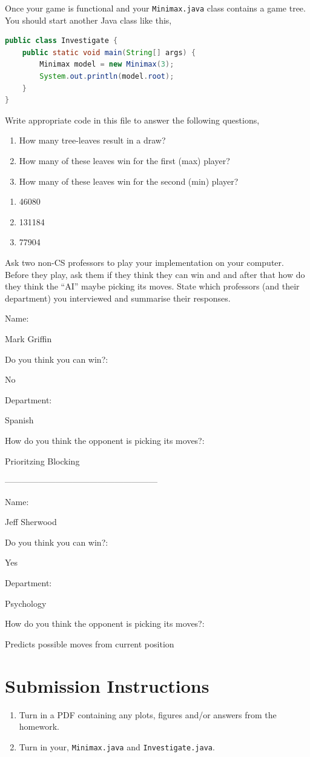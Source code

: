 \documentclass{homework}
\begin{document}
\question Once your game is functional and your \texttt{Minimax.java} class
contains a game tree.  You should start another Java class like this,
\begin{lstlisting}[language=Java]
public class Investigate {
    public static void main(String[] args) {
        Minimax model = new Minimax(3);
        System.out.println(model.root);
    }
}
\end{lstlisting}

Write appropriate code in this file to answer the following questions,

\begin{enumerate}
  \item How many tree-leaves result in a draw?
  \item How many of these leaves  win for the first (max) player?
  \item How many of these leaves win for the second (min) player?
\end{enumerate}

\begin{sol}
  \begin{enumerate}
    \item 46080
    \item 131184
    \item 77904
  \end{enumerate}
\end{sol}

\question Ask two non-CS professors to play your implementation on
your computer.  Before they play, ask them if they think they can win
and and after that how do they think the ``AI'' maybe picking its
moves.  State which professors (and their department) you interviewed
and summarise their responses.

\begin{sol}
Name:

Mark Griffin

Do you think you can win?:

No

Department:

Spanish

How do you think the opponent is picking its moves?:

Prioritzing Blocking

------------------------------------------------------

Name:

Jeff Sherwood

Do you think you can win?:

Yes

Department:

Psychology

How do you think the opponent is picking its moves?:

Predicts possible moves from current position

\end{sol}

\section*{Submission Instructions}

\begin{enumerate}
  \item Turn in a PDF containing any plots, figures and/or answers from the homework.
  \item Turn in your, \texttt{Minimax.java} and \texttt{Investigate.java}.
\end{enumerate}
\end{document}
